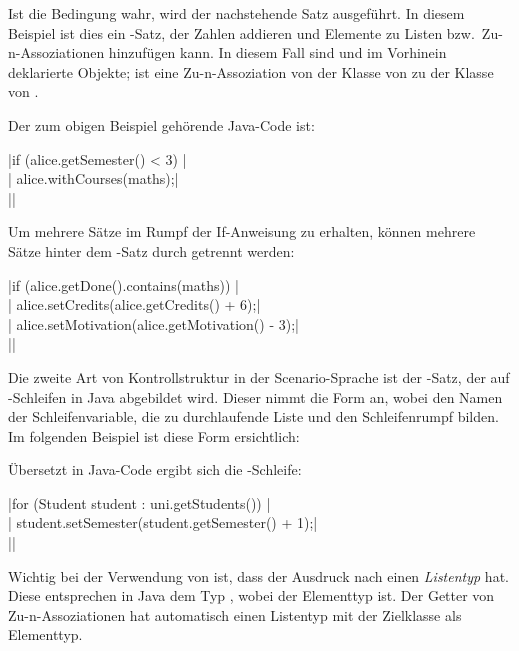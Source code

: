 Ist die Bedingung wahr, wird der nachstehende Satz ausgeführt.
In diesem Beispiel ist dies ein -Satz, der Zahlen addieren und Elemente zu Listen bzw.\ Zu-n-Assoziationen hinzufügen kann.
In diesem Fall sind  und  im Vorhinein deklarierte Objekte;
 ist eine Zu-n-Assoziation von der Klasse von  zu der Klasse von .

Der zum obigen Beispiel gehörende Java-Code ist:

\jcode|if (alice.getSemester() < 3) {|\\
\jcode|    alice.withCourses(maths);|\\
\jcode|}|

Um mehrere Sätze im Rumpf der If-Anweisung zu erhalten, können mehrere Sätze hinter dem -Satz durch  getrennt werden:


\jcode|if (alice.getDone().contains(maths)) {|\\
\jcode|   alice.setCredits(alice.getCredits() + 6);|\\
\jcode|   alice.setMotivation(alice.getMotivation() - 3);|\\
\jcode|}|

Die zweite Art von Kontrollstruktur in der Scenario-Sprache ist der -Satz, der auf -Schleifen in Java abgebildet wird.
Dieser nimmt die Form  an, wobei  den Namen der Schleifenvariable,  die zu durchlaufende Liste und  den Schleifenrumpf bilden.
Im folgenden Beispiel ist diese Form ersichtlich:


Übersetzt in Java-Code ergibt sich die -Schleife:

\jcode|for (Student student : uni.getStudents()) {|\\
\jcode|    student.setSemester(student.getSemester() + 1);|\\
\jcode|}|

Wichtig bei der Verwendung von  ist, dass der Ausdruck nach  einen \emph{Listentyp} hat.
Diese entsprechen in Java dem Typ , wobei  der Elementtyp ist.
Der Getter von Zu-n-Assoziationen hat automatisch einen Listentyp mit der Zielklasse als Elementtyp.

